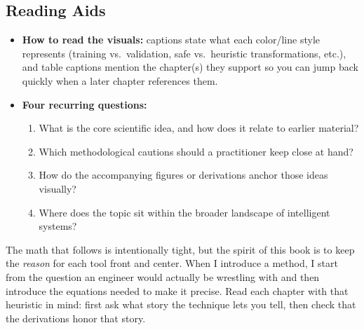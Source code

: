 \subsection*{Reading Aids}

\begin{tcolorbox}[summarybox, title={Reading aids: how to read the visuals and what to ask}]
\begin{itemize}\sloppy
    \item \textbf{How to read the visuals:} captions state what each color/line style represents (training vs.\ validation, safe vs.\ heuristic transformations, etc.), and table captions mention the chapter(s) they support so you can jump back quickly when a later chapter references them.
    \item \textbf{Four recurring questions:}
    \begin{enumerate}\sloppy
        \item What is the core scientific idea, and how does it relate to earlier material?
        \item Which methodological cautions should a practitioner keep close at hand?
        \item How do the accompanying figures or derivations anchor those ideas visually?
        \item Where does the topic sit within the broader landscape of intelligent systems?
    \end{enumerate}
\end{itemize}
\end{tcolorbox}

\begin{tcolorbox}[summarybox, title={Author's note: intuition before algebra}]
The math that follows is intentionally tight, but the spirit of this book is to keep the \emph{reason} for each tool front and center. When I introduce a method, I start from the question an engineer would actually be wrestling with and then introduce the equations needed to make it precise. Read each chapter with that heuristic in mind: first ask what story the technique lets you tell, then check that the derivations honor that story.
\end{tcolorbox}
